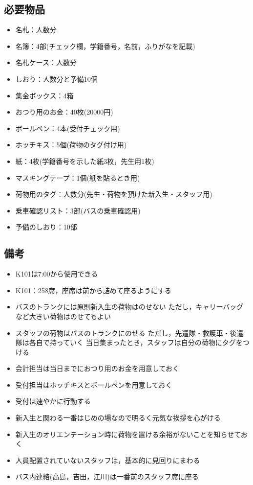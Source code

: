 


\subsection{必要物品}
\begin{itemize}
\item 名札：人数分
\item 名簿：4部(チェック欄，学籍番号，名前，ふりがなを記載)
\item 名札ケース：人数分
\item しおり：人数分と予備10個
\item 集金ボックス：4箱
\item おつり用のお金：40枚(20000円)
\item ボールペン：4本(受付チェック用)
\item ホッチキス：5個(荷物のタグ付け用)
\item 紙：4枚(学籍番号を示した紙3枚，先生用1枚)
\item マスキングテープ：1個(紙を貼るとき用)
\item 荷物用のタグ：人数分(先生・荷物を預けた新入生・スタッフ用)
\item 乗車確認リスト：3部(バスの乗車確認用)
\item 予備のしおり：10部
\end{itemize}

\newpage

\subsection{備考}
\begin{itemize}
\item K101は7:00から使用できる
\item K101：258席，座席は前から詰めて座るようにする
\item バスのトランクには原則新入生の荷物はのせない ただし，キャリーバッグなど大きい荷物はのせてもよい
\item スタッフの荷物はバスのトランクにのせる ただし，先遣隊・救護車・後遣隊は各自で持っていく 当日集まったとき，スタッフは自分の荷物にタグをつける
\item 会計担当は当日までにおつり用のお金を用意しておく
\item 受付担当はホッチキスとボールペンを用意しておく
\item 受付は速やかに行動する
\item 新入生と関わる一番はじめの場なので明るく元気な挨拶を心がける
\item 新入生のオリエンテーション時に荷物を置ける余裕がないことを知らせておく
\item 人員配置されていないスタッフは，基本的に見回りにまわる
\item バス内連絡(高島，吉田，江川)は一番前のスタッフ席に座る 
\end{itemize}



